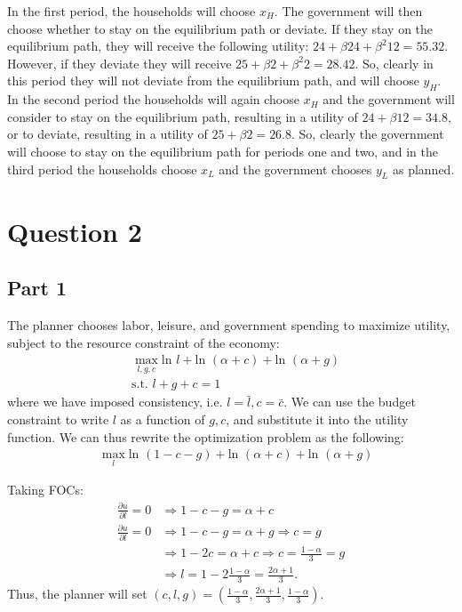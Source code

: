 \documentclass[11pt]{article} %
\begin{document}
In the first period, the households will choose $x_H$. The government will then choose whether to stay on the equilibrium path or deviate. If they stay on the equilibrium path, they will receive the following utility: $24 + \beta 24 + \beta^2 12 = 55.32 $. However, if they deviate they will receive $25 + \beta 2 +\beta^2 2 = 28.42$. So, clearly in this period they will not deviate from the equilibrium path, and will choose $y_H$. In the second period the households will again choose $x_H$ and the government will consider to stay on the equilibrium path, resulting in a utility of $24+\beta 12 = 34.8$, or to deviate, resulting in a utility of $25 +\beta 2 = 26.8$. So, clearly the government will choose to stay on the equilibrium path for periods one and two, and in the third period the households choose $x_L$ and the government chooses $y_L$ as planned. 

\section{Question 2}
\subsection{Part 1}
The planner chooses labor, leisure, and government spending to maximize utility, subject to the resource constraint of the economy:
\begin{align*}
&\max_{l,g,c} \text{ln }l +\text{ln }(\alpha + c) +\text{ln }(\alpha + g)\\
&\text{s.t. } l+g+c = 1
\end{align*}
where we have imposed consistency, i.e. $l = \bar{l},c = \bar{c}$. We can use the budget constraint to write $l$ as a function of $g,c$, and substitute it into the utility function. We can thus rewrite the optimization problem as the following:
\begin{align*}
&\max_{l} \text{ln }(1-c-g) +\text{ln }(\alpha + c) +\text{ln }(\alpha + g)
\end{align*}

Taking FOCs:
\begin{align*}
\frac{\partial u}{\partial l} = 0 &\Rightarrow 1-c-g = \alpha + c \\
\frac{\partial u}{\partial l} = 0 &\Rightarrow 1-c-g = \alpha + g \Rightarrow c=g \\
&\Rightarrow 1-2c = \alpha + c \Rightarrow c = \frac{1-\alpha}{3} = g\\
&\Rightarrow l = 1 - 2\frac{1-\alpha}{3} = \frac{2\alpha +1}{3}.
\end{align*}
Thus, the planner will set $(c,l,g) = \left( \frac{1-\alpha}{3} , \frac{2\alpha +1}{3}, \frac{1-\alpha}{3}  \right)$.
\end{document}
